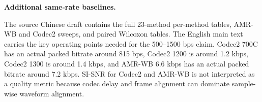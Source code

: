 ﻿\documentclass[conference]{IEEEtran}
\begin{document}
\textbf{Additional same-rate baselines.}

The source Chinese draft contains the full 23-method per-method tables, AMR-WB and Codec2 sweeps, and paired Wilcoxon tables. The English main text carries the key operating points needed for the 500--1500 bps claim. Codec2 700C has an actual packed bitrate around 815 bps, Codec2 1200 is around 1.2 kbps, Codec2 1300 is around 1.4 kbps, and AMR-WB 6.6 kbps has an actual packed bitrate around 7.2 kbps. SI-SNR for Codec2 and AMR-WB is not interpreted as a quality metric because codec delay and frame alignment can dominate sample-wise waveform alignment.
\end{document}
